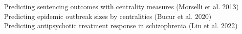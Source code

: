 \documentclass[preview]{standalone}
\begin{document}
Predicting sentencing outcomes with centrality measures (Morselli et al. 2013)\\Predicting epidemic outbreak sizes by centralities (Bucur et al. 2020)\\Predicting antipsychotic treatment response in schizophrenia (Liu et al. 2022)\\
\end{document}
